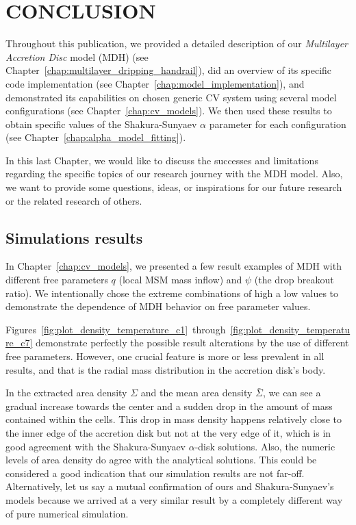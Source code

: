 \chapter{CONCLUSION}
\thispagestyle{empty}

    Throughout this publication, we provided a detailed description of our \emph{Multilayer Accretion Disc} model (MDH) (see Chapter~\ref{chap:multilayer_dripping_handrail}), did an overview of its specific code implementation (see Chapter~\ref{chap:model_implementation}), and demonstrated its capabilities on chosen generic CV system using several model configurations (see Chapter~\ref{chap:cv_models}). We then used these results to obtain specific values of the Shakura-Sunyaev $\alpha$ parameter for each configuration (see Chapter~\ref{chap:alpha_model_fitting}). 

    In this last Chapter, we would like to discuss the successes and limitations regarding the specific topics of our research journey with the MDH model. Also, we want to provide some questions, ideas, or inspirations for our future research or the related research of others.
    
\section{Simulations results}
    In Chapter~\ref{chap:cv_models}, we presented a few result examples of MDH with different free parameters $q$ (local MSM mass inflow) and $\psi$ (the drop breakout ratio). We intentionally chose the extreme combinations of high a low values to demonstrate the dependence of MDH behavior on free parameter values. 

    Figures~\ref{fig:plot_density_temperature_c1}~through~\ref{fig:plot_density_temperature_c7} demonstrate perfectly the possible result alterations by the use of different free parameters. However, one crucial feature is more or less prevalent in all results, and that is the radial mass distribution in the accretion disk's body. 

    In the extracted area density $\Sigma$ and the mean area density $\bar{\Sigma}$, we can see a gradual increase towards the center and a sudden drop in the amount of mass contained within the cells. This drop in mass density happens relatively close to the inner edge of the accretion disk but not at the very edge of it, which is in good agreement with the Shakura-Sunyaev $\alpha$-disk solutions. Also, the numeric levels of area density do agree with the analytical solutions. This could be considered a good indication that our simulation results are not far-off. Alternatively, let us say a mutual confirmation of ours and Shakura-Sunyaev's models because we arrived at a very similar result by a completely different way of pure numerical simulation.

